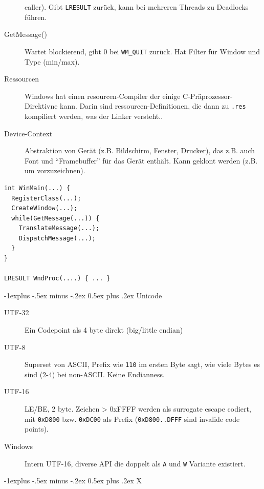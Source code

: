 \documentclass[10pt,landscape,a4paper]{article}
\makeatletter
\renewcommand{\subsection}{\@startsection{subsection}{2}{0mm}%
                                {-1explus -.5ex minus -.2ex}%
                                {0.5ex plus .2ex}%
                                {\normalfont\small\bfseries}}
\makeatother
\begin{document}
\begin{multicols*}{3}
\begin{description}
     caller). Gibt \verb|LRESULT| zurück, kann bei mehreren Threads zu Deadlocks führen.
   \item[GetMessage()] Wartet blockierend, gibt 0 bei \verb|WM_QUIT| zurück. Hat
     Filter für Window und Type (min/max).
   \item[Ressourcen] Windows hat einen resourcen-Compiler der einige
     C-Präprozessor-Direktivne kann. Darin sind ressourcen-Definitionen, die
     dann zu \verb|.res| kompiliert werden, was der Linker versteht..
   \item[Device-Context] Abstraktion von Gerät (z.B. Bildschirm, Fenster,
     Drucker), das z.B. auch Font und ``Framebuffer'' für das Gerät enthält.
     Kann geklont werden (z.B. um vorzuzeichnen).
\end{description}


\begin{verbatim}
int WinMain(...) {  
  RegisterClass(...);
  CreateWindow(...); 
  while(GetMessage(...)) { 
    TranslateMessage(...); 
    DispatchMessage(...);
  }
} 

LRESULT WndProc(....) { ... } 
\end{verbatim}

\columnbreak

\subsection{Unicode}

\begin{description}
  \item[UTF-32] Ein Codepoint als 4 byte direkt (big/little endian)
  \item[UTF-8] Superset von ASCII, Prefix wie \verb|110| im ersten Byte sagt,
    wie viele Bytes es sind (2-4) bei non-ASCII. Keine Endianness.
  \item[UTF-16] LE/BE, 2 byte. Zeichen > 0xFFFF werden als surrogate escape codiert, mit
    \verb|0xD800| bzw. \verb|0xDC00| als Prefix (\verb|0xD800..DFFF| sind
    invalide code points).
  \item[Windows] Intern UTF-16, diverse API die doppelt als \verb|A| und
    \verb|W| Variante existiert.
\end{description}

\subsection{X}


\end{multicols*}
\end{document}
